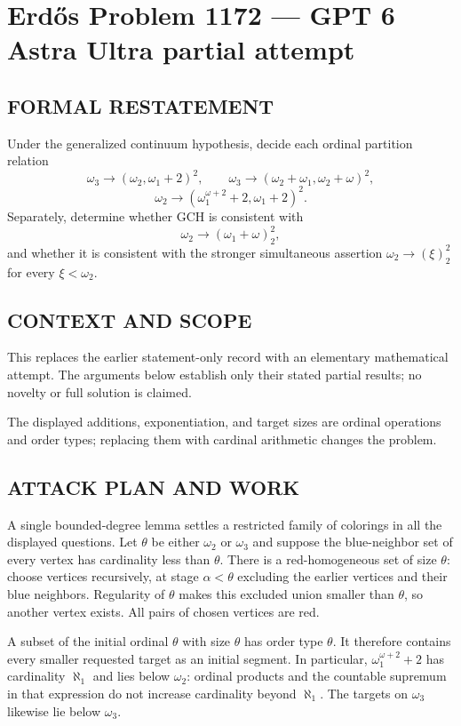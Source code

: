 \section*{Erd\H{o}s Problem 1172 --- GPT 6 Astra Ultra partial attempt}


\subsection*{FORMAL RESTATEMENT}
Under the generalized continuum hypothesis, decide each ordinal partition relation
\[
\omega_3\longrightarrow(\omega_2,\omega_1+2)^2,
\qquad
\omega_3\longrightarrow(\omega_2+\omega_1,\omega_2+\omega)^2,
\]
\[
\omega_2\longrightarrow(\omega_1^{\omega+2}+2,\omega_1+2)^2.
\]
Separately, determine whether GCH is consistent with
\[
\omega_2\longrightarrow(\omega_1+\omega)^2_2,
\]
and whether it is consistent with the stronger simultaneous assertion $\omega_2\longrightarrow(\xi)^2_2$ for every $\xi<\omega_2$.

\subsection*{CONTEXT AND SCOPE}
This replaces the earlier statement-only record with an elementary mathematical attempt. The arguments below establish only their stated partial results; no novelty or full solution is claimed.

The displayed additions, exponentiation, and target sizes are ordinal operations and order types; replacing them with cardinal arithmetic changes the problem.

\subsection*{ATTACK PLAN AND WORK}
A single bounded-degree lemma settles a restricted family of colorings in all
the displayed questions. Let $\theta$ be either $\omega_2$ or $\omega_3$ and
suppose the blue-neighbor set of every vertex has cardinality less than $\theta$.
There is a red-homogeneous set of size $\theta$: choose vertices recursively,
at stage $\alpha<\theta$ excluding the earlier vertices and their blue neighbors.
Regularity of $\theta$ makes this excluded union smaller than $\theta$, so another
vertex exists. All pairs of chosen vertices are red.

A subset of the initial ordinal $\theta$ with size $\theta$ has order type
$\theta$. It therefore contains every smaller requested target as an initial
segment. In particular, $\omega_1^{\omega+2}+2$ has cardinality $\aleph_1$ and
lies below $\omega_2$: ordinal products and the countable supremum in that
expression do not increase cardinality beyond $\aleph_1$. The targets on
$\omega_3$ likewise lie below $\omega_3$.


